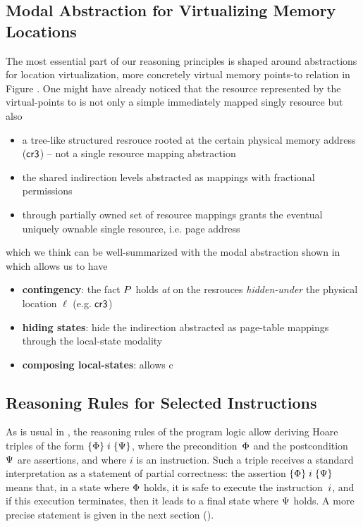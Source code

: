 \subsection{Modal Abstraction for Virtualizing Memory Locations}
\label{sec:modallocationvirtualization}

The most essential part of our reasoning principles is shaped around abstractions for location virtualization, more concretely virtual memory points-to relation in Figure . One might have already noticed that the resource represented by the virtual-points to is not only a simple immediately mapped singly resource but also
\begin{itemize}
\item a tree-like structured resrouce rooted at the certain physical memory address ($\mathsf{cr3}$) -- not a single resource mapping abstraction 
\item the shared indirection levels abstracted as mappings with fractional permissions
\item through partially owned set of resource mappings grants the eventual uniquely ownable single resource, i.e. page address 
\end{itemize}
which we think can be well-summarized with the modal abstraction shown in  which allows us to have
\begin{itemize}
  \item \textbf{contingency}: the fact $P$ holds \textit{at} on the resrouces \textit{hidden-under} the physical location $\ell$ (e.g. $\mathsf{cr3}$)
  \item \textbf{hiding states}: hide the indirection abstracted as page-table mappings through the local-state modality
  \item \textbf{composing local-states}: allows c
\end{itemize}

\subsection{Reasoning Rules for Selected Instructions}
\label{sec:reasoning}

As is usual in \SL, the reasoning rules of the program logic allow deriving
Hoare triples of the form $\{\Phi\}\;i\;\{\Psi\}$, where the
precondition~$\Phi$ and the postcondition~$\Psi$ are assertions,
and where $i$ is an instruction.
Such a triple receives a standard interpretation as a statement of partial
correctness: the assertion $\{\Phi\}\;i\;\{\Psi\}$ means that, in a state
where $\Phi$ holds, it is safe to execute the instruction~$i$, and if
this execution terminates, then it leads to a final state where $\Psi$ holds.
A more precise statement is given in the next section ().

